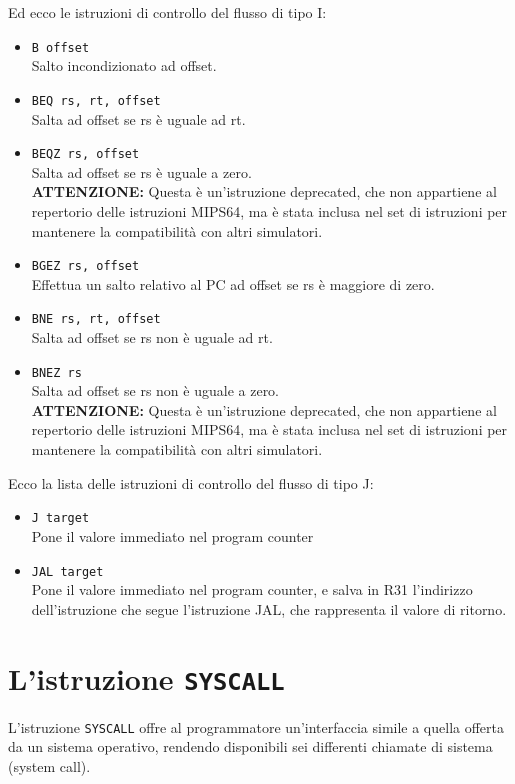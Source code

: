\documentclass[12pt]{report}
\newcommand{\MS}{MIPS64}
\newcommand{\SC}{\texttt{SYSCALL}}
\newcommand{\WARN}{\textbf{ATTENZIONE:} Questa \`{e} un'istruzione deprecated, che
non appartiene al repertorio delle istruzioni \MS{}, ma \`{e} stata inclusa nel set di
istruzioni per mantenere la compatibilit\`{a} con altri simulatori.}
\begin{document}
Ed ecco le istruzioni di controllo del flusso di tipo I:

\begin{itemize}
	\item \texttt{B offset}\\
	Salto incondizionato ad offset.

	\item \texttt{BEQ rs, rt, offset}\\
	Salta ad offset se rs \`{e} uguale ad rt.

	\item \texttt{BEQZ rs, offset}\\
	Salta ad offset se rs \`{e} uguale a zero.\\
	\WARN

	\item \texttt{BGEZ rs, offset}\\
	Effettua un salto relativo al PC ad offset se rs \`e maggiore di zero.

	\item \texttt{BNE rs, rt, offset}\\
	Salta ad offset se rs non \`{e} uguale ad rt.

	\item \texttt{BNEZ rs}\\
	Salta ad offset se rs non \`{e} uguale a zero.\\
	\WARN
\end{itemize}

Ecco la lista delle istruzioni di controllo del flusso di tipo J:

\begin{itemize}
	\item \texttt{J target}\\
	Pone il valore immediato nel program counter

	\item \texttt{JAL target}\\
	Pone il valore immediato nel program counter, e salva in R31 l'indirizzo 
	dell'istruzione che segue l'istruzione JAL, che rappresenta il valore di ritorno.
\end{itemize}

\section{L'istruzione \texttt{SYSCALL}}
\label{sysc-man}
L'istruzione \SC{} offre al programmatore un'interfaccia simile a quella offerta 
da un sistema operativo, rendendo disponibili sei differenti chiamate di sistema (system call).
\end{document}
